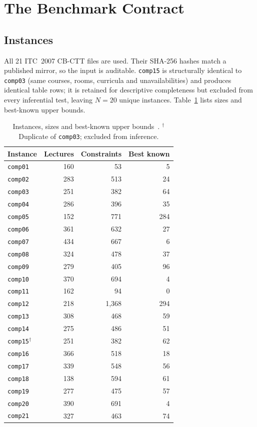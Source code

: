\documentclass[journal]{IEEEtran}
\newcommand{\code}[1]{\texttt{#1}}
\begin{document}
\section{The Benchmark Contract}
\label{sec:contract}
\subsection{Instances}
All 21 ITC~2007 CB-CTT files are used. Their SHA-256 hashes match a published mirror, so the input is auditable. \code{comp15} is structurally identical to \code{comp03} (same courses, rooms, curricula and unavailabilities) and produces identical table rows; it is retained for descriptive completeness but excluded from every inferential test, leaving $N=20$ unique instances. Table~\ref{tab:instances} lists sizes and best-known upper bounds.

\begin{table}[!t]
\caption{Instances, sizes and best-known upper bounds~\cite{ceschia2022educational}. $^\dagger$Duplicate of \code{comp03}; excluded from inference.}
\label{tab:instances}
\centering
\small
\begin{tabular}{l r r r}
\toprule
Instance & Lectures & Constraints & Best known \\
\midrule
\code{comp01} & 160 & 53 & 5 \\
\code{comp02} & 283 & 513 & 24 \\
\code{comp03} & 251 & 382 & 64 \\
\code{comp04} & 286 & 396 & 35 \\
\code{comp05} & 152 & 771 & 284 \\
\code{comp06} & 361 & 632 & 27 \\
\code{comp07} & 434 & 667 & 6 \\
\code{comp08} & 324 & 478 & 37 \\
\code{comp09} & 279 & 405 & 96 \\
\code{comp10} & 370 & 694 & 4 \\
\code{comp11} & 162 & 94 & 0 \\
\code{comp12} & 218 & 1{,}368 & 294 \\
\code{comp13} & 308 & 468 & 59 \\
\code{comp14} & 275 & 486 & 51 \\
\code{comp15}$^\dagger$ & 251 & 382 & 62 \\
\code{comp16} & 366 & 518 & 18 \\
\code{comp17} & 339 & 548 & 56 \\
\code{comp18} & 138 & 594 & 61 \\
\code{comp19} & 277 & 475 & 57 \\
\code{comp20} & 390 & 691 & 4 \\
\code{comp21} & 327 & 463 & 74 \\
\bottomrule
\end{tabular}
\end{table}
\end{document}

